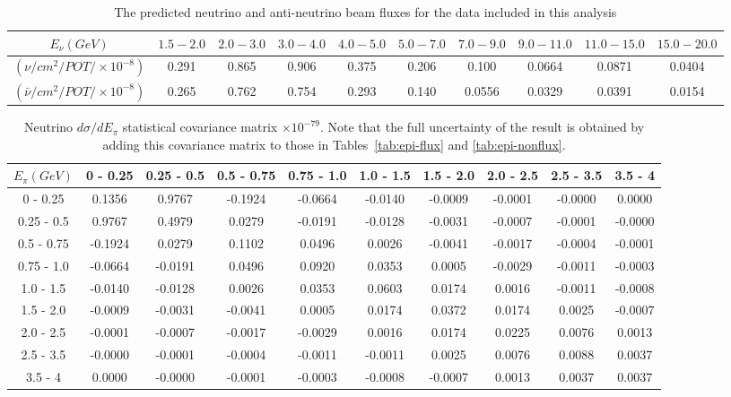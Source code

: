 \documentclass[aps,prl,twocolumn,showpacs,superscriptaddress,nofootinbib]{revtex4}
\begin{document}
\begingroup
\squeezetable
\begin{table}[h]
\tabcolsep=0.11cm
\begin{tabular}{c|c|c|c|c|c|c|c|c|c}
$E_{\nu}(GeV)$ & $1.5 - 2.0$ & $2.0 - 3.0$ & $3.0 - 4.0$ & $4.0 - 5.0$ & $5.0 - 7.0$ & $7.0 - 9.0$ & $9.0 - 11.0$ & $11.0 - 15.0$ & $15.0 - 20.0$\\
\hline
$(\nu/cm^{2}/POT/ \times 10^{-8})$ &0.291	&0.865&	0.906&	0.375	&0.206&	0.100&	0.0664	&0.0871	&0.0404 \\
\hline
$({\bar{\nu}}/cm^{2}/POT/ \times 10^{-8})$ &0.265&	0.762&	0.754	&0.293&	0.140&	0.0556&	0.0329&	0.0391&	0.0154 \\
\end{tabular}
\caption{The predicted neutrino and anti-neutrino beam fluxes for the data included in this analysis}
\end{table}
\endgroup

\begingroup
\squeezetable
\begin{table}[h]
\tabcolsep=0.11cm
\begin{tabular}{c|ccccccccc}
$E_{\pi}(GeV)$ & 0 - 0.25 & 0.25 - 0.5 & 0.5 - 0.75 & 0.75 - 1.0 & 1.0 - 1.5 & 1.5 - 2.0 & 2.0 - 2.5 & 2.5 - 3.5 & 3.5 - 4 \\
\hline
0 - 0.25 &0.1356&	0.9767&	-0.1924&	-0.0664&	-0.0140&	-0.0009&	-0.0001&	-0.0000&	0.0000\\	
0.25 - 0.5 &0.9767&	0.4979&	0.0279&	-0.0191&	-0.0128&	-0.0031&	-0.0007&	-0.0001&	-0.0000	\\
0.5 - 0.75 &-0.1924&	0.0279&	0.1102&	0.0496&	0.0026&	-0.0041&	-0.0017&	-0.0004&	-0.0001	\\
0.75 - 1.0 &-0.0664&	-0.0191& 0.0496&	0.0920&	0.0353&	0.0005&	-0.0029&	-0.0011&	-0.0003	\\
1.0 - 1.5 &-0.0140&	-0.0128& 0.0026&	0.0353&	0.0603&	0.0174&	0.0016&	-0.0011&	-0.0008	\\
1.5 - 2.0 &-0.0009&	-0.0031& -0.0041&	0.0005&	0.0174&	0.0372&	0.0174&	0.0025&	-0.0007	\\
2.0 - 2.5 &-0.0001&	-0.0007&	-0.0017&	-0.0029&	0.0016&	0.0174&	0.0225&	0.0076&	0.0013	\\
2.5 - 3.5& -0.0000&	-0.0001&	-0.0004&	-0.0011&	-0.0011&	0.0025&	0.0076&	0.0088&	0.0037	\\
3.5 - 4 &0.0000	&-0.0000&	-0.0001&	-0.0003&	-0.0008&	-0.0007&	0.0013&	0.0037&	0.0037	\\
 
\end{tabular}
\caption{Neutrino $d\sigma/dE_\pi$ statistical covariance matrix  $\times 10^{-79}$.  Note that the full uncertainty of the result is obtained by adding this covariance matrix to those in Tables~\ref{tab:epi-flux} and \ref{tab:epi-nonflux}. }
\end{table}
\endgroup
\end{document}
